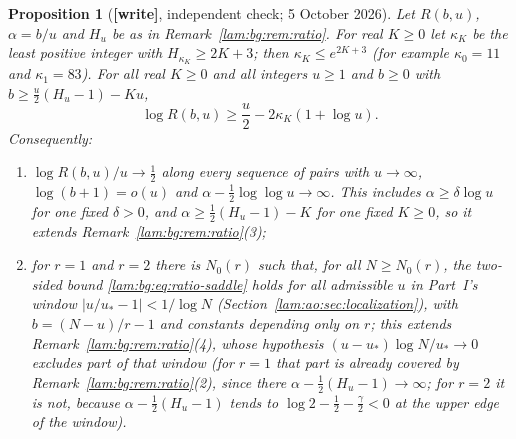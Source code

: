 \documentclass[11pt,a4paper]{article}
\numberwithin{equation}{section}
\newtheorem{proposition}[theorem]{Proposition}
\theoremstyle{remark}
\newcommand{\wtag}{\textup{\textbf{[write]}}}
\begin{document}
\begin{proposition}[\wtag, independent check; 5 October 2026]\label{lam:bg:prop:tilt}
Let $R(b,u)$, $\alpha=b/u$ and $H_u$ be as in Remark~\ref{lam:bg:rem:ratio}. For real $K\ge0$ let $\kappa_K$ be the least positive integer with $H_{\kappa_K}\ge2K+3$; then $\kappa_K\le e^{2K+3}$ (for example $\kappa_0=11$ and $\kappa_1=83$). For all real $K\ge0$ and all integers $u\ge1$ and $b\ge0$ with $b\ge\frac u2(H_u-1)-Ku$,
\begin{equation}\label{lam:bg:eq:ratio-tilt}
 \log R(b,u)\ge\frac u2-2\kappa_K(1+\log u).
\end{equation}
Consequently:
\begin{enumerate}
\item $\log R(b,u)/u\to\frac12$ along every sequence of pairs with $u\to\infty$, $\log(b+1)=o(u)$ and $\alpha-\frac12\log\log u\to\infty$. This includes $\alpha\ge\delta\log u$ for one fixed $\delta>0$, and $\alpha\ge\frac12(H_u-1)-K$ for one fixed $K\ge0$, so it extends Remark~\ref{lam:bg:rem:ratio}(3);
\item for $r=1$ and $r=2$ there is $N_0(r)$ such that, for all $N\ge N_0(r)$, the two-sided bound \eqref{lam:bg:eq:ratio-saddle} holds for all admissible $u$ in Part~I's window $|u/u_*-1|<1/\log N$ (Section~\ref{lam:ao:sec:localization}), with $b=(N-u)/r-1$ and constants depending only on $r$; this extends Remark~\ref{lam:bg:rem:ratio}(4), whose hypothesis $(u-u_*)\log N/u_*\to0$ excludes part of that window (for $r=1$ that part is already covered by Remark~\ref{lam:bg:rem:ratio}(2), since there $\alpha-\frac12(H_u-1)\to\infty$; for $r=2$ it is not, because $\alpha-\frac12(H_u-1)$ tends to $\log2-\frac12-\frac\gamma2<0$ at the upper edge of the window).
\end{enumerate}
\end{proposition}
\end{document}
